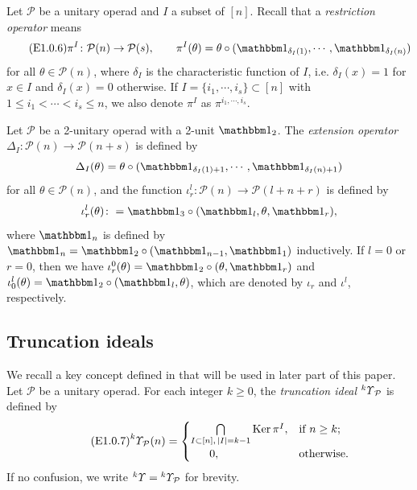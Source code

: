 \documentclass{amsart}
\theoremstyle{definition}
\theoremstyle{remark}
\numberwithin{equation}{section}
\newcommand{\up}[1]{{^{#1}{\it \!\Upsilon}}}
\def \ip{{\mathcal{P}}}
\def \iu{\!{\it{\Upsilon}}}
\def \ker{\operatorname{Ker}}
\def \1{\mathbbm 1}
\begin{document}
Let $\ip$ be a unitary operad and $I$ a subset of $[n]$.
Recall that a {\it restriction operator} 
\cite[Section 2.2.1]{Fr} means
\begin{equation}
\label{E1.0.6}\tag{E1.0.6}
\pi^{I}\colon \ip(n)\to\ip(s),\qquad \pi^{I}(\theta)=
\theta\circ(\1_{\delta_{I}(1)}, \cdots, \1_{\delta_{I}(n)})
\end{equation}
for all $\theta\in \ip(n)$, where $\delta_{I}$ is the 
characteristic function of $I$, i.e. $\delta_{I}(x)=1$ 
for $x\in I$ and $\delta_{I}(x)=0$ otherwise. If 
$I=\{i_1, \cdots, i_s\}\subset [n]$ with 
$1\le i_1<\cdots<i_s\le n$, we also denote
$\pi^I$ as $\pi^{i_1, \cdots, i_s}$. 

 
Let $\ip$ be a 2-unitary operad with a 2-unit $\1_2$. 
The \textit{extension operator} 
$\Delta_I\colon \ip(n)\to \ip(n+s)$
is defined by 
\[\Delta_I(\theta)=\theta\circ 
(\1_{\delta_I(1)+1}, \cdots, \1_{\delta_I(n)+1})\]
for all $\theta\in \ip(n)$, and the function 
$\iota_r^l\colon \ip(n)\to \ip(l+n+r)$ is defined by
\[\iota_r^l(\theta)\colon= \1_3\circ (\1_l, \theta, \1_r),\]
where $\1_n$ is defined by $\1_n=\1_2\circ (\1_{n-1}, \1_1)$ 
inductively. If $l=0$ or $r=0$, then we have 
$\iota^0_r(\theta)=\1_2\circ (\theta, \1_r)$ and 
$\iota_0^l(\theta)=\1_2\circ (\1_l, \theta)$, which are 
denoted by $\iota_r$ and $\iota^l$, respectively. 


\subsection{Truncation ideals}
\label{yysec1.5}
We recall a key concept defined in \cite{BYZ} that will 
be used in later part of this paper. Let $\ip$ be a 
unitary operad. For each integer $k\ge0$, the 
{\it truncation ideal} $\up{k}_\ip$ is defined by
\begin{equation*}
\label{E1.0.7}\tag{E1.0.7}
^k\iu_\ip(n)=\begin{cases}
\bigcap\limits_{I\subset [n],\, |I|= k-1} \ker\pi^I, 
& \text{if }n\ge k;\\
\quad\ \ 0, & \text{otherwise}.
\end{cases}
\end{equation*}
If no confusion, we write ${^k\iu}={^k\iu_\ip}$ for 
brevity. 
\end{document}
